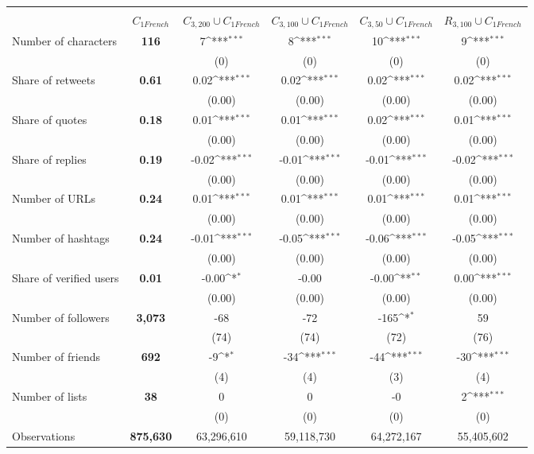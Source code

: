 {
\def\sym#1{\ifmmode^{#1}\else\(^{#1}\)\fi}
\begin{tabular}{l*{1}{>{\bfseries}ccccc}}
\hline\hline
                    &\multicolumn{5}{c}{}                           \\
                    &$C_{1French}$&$C_{3,200} \cup C_{1French}$&$C_{3,100} \cup C_{1French}$&$C_{3,50} \cup C_{1French}$&$R_{3,100} \cup C_{1French}$\\
\hline
Number of characters&  116&    7\sym{***}&   8\sym{***}&   10\sym{***}&    9\sym{***}\\
                    &     &           (0)&          (0)&           (0)&           (0)\\
Share of retweets   & 0.61& 0.02\sym{***}&0.02\sym{***}& 0.02\sym{***}& 0.02\sym{***}\\
                    &     &        (0.00)&       (0.00)&        (0.00)&        (0.00)\\
Share of quotes     & 0.18& 0.01\sym{***}&0.01\sym{***}& 0.02\sym{***}& 0.01\sym{***}\\
                    &     &        (0.00)&       (0.00)&        (0.00)&        (0.00)\\
Share of replies    & 0.19&-0.02\sym{***}&-0.01\sym{***}&-0.01\sym{***}&-0.02\sym{***}\\
                    &     &        (0.00)&       (0.00)&        (0.00)&        (0.00)\\
Number of URLs      & 0.24& 0.01\sym{***}&0.01\sym{***}& 0.01\sym{***}&  0.01\sym{***}\\
                    &     &        (0.00)&       (0.00)&        (0.00)&        (0.00)\\
Number of hashtags  & 0.24&-0.01\sym{***}&-0.05\sym{***}&-0.06\sym{***}&-0.05\sym{***}\\
                    &     &        (0.00)&       (0.00)&        (0.00)&        (0.00)\\
Share of verified users&0.01&-0.00\sym{*}&        -0.00& -0.00\sym{**}& 0.00\sym{***}\\
                    &     &        (0.00)&       (0.00)&        (0.00)&        (0.00)\\
Number of followers &3,073&           -68&          -72&   -165\sym{*}&            59\\
                    &     &          (74)&         (74)&          (72)&          (76)\\
Number of friends   &  692&     -9\sym{*}& -34\sym{***}&  -44\sym{***}&  -30\sym{***}\\
                    &     &          (4) &          (4)&           (3)&           (4)\\
Number of lists     &   38&             0&            0&            -0&    2\sym{***}\\
                    &     &           (0)&          (0)&           (0)&           (0)\\
\hline
Observations        &875,630&  63,296,610&   59,118,730&    64,272,167&    55,405,602\\
\hline\hline
\end{tabular}
}
